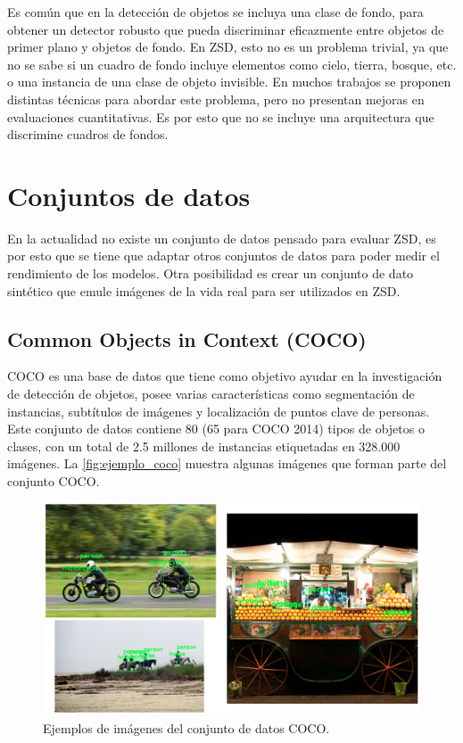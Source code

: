 Es común que en la detección de objetos se incluya una clase de fondo, para obtener un detector robusto que pueda discriminar eficazmente entre objetos de primer plano y objetos de fondo. En ZSD, esto no es un problema trivial, ya que no se sabe si un cuadro de fondo incluye elementos como cielo, tierra, bosque, etc. o una instancia de una clase de objeto invisible. En muchos trabajos se proponen distintas técnicas para abordar este problema, pero no presentan mejoras en evaluaciones cuantitativas. Es por esto que no se incluye una arquitectura que discrimine cuadros de fondos.

\section{Conjuntos de datos} \label{sec:conjuntosdedatos}

En la actualidad no existe un conjunto de datos pensado para evaluar ZSD, es por esto que se tiene que adaptar otros conjuntos de datos para poder medir el rendimiento de los modelos. Otra posibilidad es crear un conjunto de dato sintético que emule imágenes de la vida real para ser utilizados en ZSD.

\subsection{Common Objects in Context (COCO)}\label{ssec:commonobjectsincontext}

COCO es una base de datos que tiene como objetivo ayudar en la investigación de detección de objetos, posee varias características como segmentación de instancias, subtítulos de imágenes y localización de puntos clave de personas. Este conjunto de datos contiene 80 (65 para COCO 2014) tipos de objetos o  clases, con un total de 2.5 millones de instancias etiquetadas en 328.000 imágenes. La \autoref{fig:ejemplo_coco} muestra algunas imágenes que forman parte del conjunto COCO.

\begin{figure}
	\begin{center}
		\centering
		\includegraphics[width=1\textwidth]{img/coco_ejemplo.png}
		\caption{Ejemplos de imágenes del conjunto de datos COCO.}
		\label{fig:ejemplo_coco}
	\end{center}	
\end{figure}

